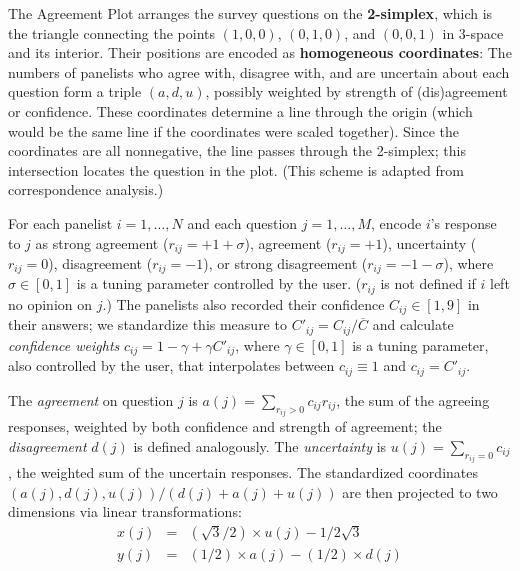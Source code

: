 \documentclass{article}
\begin{document}
The Agreement Plot arranges the survey questions on the {\bf 2-simplex}, which is the triangle connecting the points \((1,0,0)\), \((0,1,0)\), and \((0,0,1)\) in 3-space and its interior. Their positions are encoded as {\bf homogeneous coordinates}: The numbers of panelists who agree with, disagree with, and are uncertain about each question form a triple \((a,d,u)\), possibly weighted by strength of (dis)agreement or confidence. These coordinates determine a line through the origin (which would be the same line if the coordinates were scaled together). Since the coordinates are all nonnegative, the line passes through the 2-simplex; this intersection locates the question in the plot. (This scheme is adapted from correspondence analysis.)

For each panelist \(i=1,\ldots,N\) and each question \(j=1,\ldots,M\), encode \(i\)'s response to \(j\) as strong agreement (\(r_{ij}=+1+\sigma\)), agreement (\(r_{ij}=+1\)), uncertainty (\(r_{ij}=0\)), disagreement (\(r_{ij}=-1\)), or strong disagreement (\(r_{ij}=-1-\sigma\)), where \(\sigma\in[0,1]\) is a tuning parameter controlled by the user. (\(r_{ij}\) is not defined if \(i\) left no opinion on \(j\).) The panelists also recorded their confidence \(C_{ij}\in[1,9]\) in their answers; we standardize this measure to \(C'_{ij}=C_{ij}/\overline{C}\) and calculate {\em confidence weights} \(c_{ij}=1-\gamma+\gamma C'_{ij}\), where \(\gamma\in[0,1]\) is a tuning parameter, also controlled by the user, that interpolates between \(c_{ij}\equiv 1\) and \(c_{ij}=C'_{ij}\).

The {\em agreement} on question \(j\) is \(a(j)=\sum_{r_{ij}>0}{c_{ij}r_{ij}}\), the sum of the agreeing responses, weighted by both confidence and strength of agreement; the {\em disagreement} \(d(j)\) is defined analogously. The {\em uncertainty} is \(u(j)=\sum_{r_{ij}=0}{c_{ij}}\), the weighted sum of the uncertain responses. The standardized coordinates \((a(j),d(j),u(j))/(d(j)+a(j)+u(j))\) are then projected to two dimensions via linear transformations:
\begin{eqnarray*}
x(j) &= &({\sqrt{3}}/{2})\times u(j) - {1}/{2\sqrt{3}} \\
y(j) &= &({1}/{2})\times a(j) - ({1}/{2})\times d(j)
\end{eqnarray*}
\end{document}
